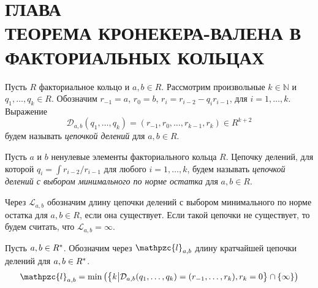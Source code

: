 \documentclass[_00_dissertation.tex]{subfiles}
\begin{document}
\onlyinsubfile{
    \renewcommand{\contentsname}{ОГЛАВЛЕНИЕ}
    \setcounter{tocdepth}{3}
    \tableofcontents
}

\chapter*{\MakeUppercase{Глава \\ Теорема Кронекера-Валена в факториальных кольцах}}\label{chapter:Kronecker-Vahlen theorem}

\begin{definition}
    Пусть $R$ факториальное кольцо и $a, b \in R$.
    Рассмотрим произвольные $k \in \mathbb{N}$ и $q_1, \dots, q_k \in R$.
    Обозначим $r_{-1} = a$, $r_0 = b$, $r_i = r_{i-2} - q_i r_{i-1}$, для $i = 1, \dots, k$.
    Выражение
    \begin{equation*}
        \mathcal{D}_{a, b}(q_1, \dots, q_k) = (r_{-1}, r_0, \dots, r_{k-1}, r_k) \in R^{k+2}
    \end{equation*}
    будем называть \emph{цепочкой делений} для $a, b \in R$.
\end{definition}

\begin{definition}
    Пусть $a$ и $b$ ненулевые элементы факториального кольца $R$.
    Цепочку делений, для которой $q_i = \int{r_{i-2}/r_{i-1}}$ для любого $i = 1, \dots, k$, будем называть \emph{цепочкой делений с выбором минимального по норме остатка} для $a, b \in R$.

    Через $\mathcal{L}_{a, b}$ обозначим длину цепочки делений с выбором минимального по норме остатка для $a, b \in R$, если она существует.
    Если такой цепочки не существует, то будем считать, что $\mathcal{L}_{a, b} = \infty$.
\end{definition}

\begin{definition}
    Пусть $a, b \in R^{*}$.
    Обозначим через $\mathpzc{l}_{a, b}$ длину кратчайшей цепочки делений для $a, b \in R^{*}$.
    \begin{equation*}
        \mathpzc{l}_{a, b} = \min\left(
            \left\{
                k \big| \mathcal{D}_{a, b}(q_1, \dots, q_k) = (r_{-1}, \dots, r_k), r_k = 0
            \right\} \cap \{\infty\}
        \right)
    \end{equation*}
\end{definition}
\end{document}
